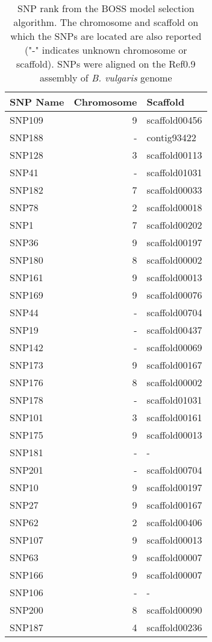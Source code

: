 \documentclass[smallextended]{svjour3}       %
\begin{document}
\begin{longtable}{lrl}
\caption{SNP rank from the BOSS model selection algorithm. The chromosome and scaffold on which the SNPs are located are also reported ("-" indicates unknown chromosome or scaffold). SNPs were aligned on the Ref0.9 assembly of \emph{B. vulgaris} genome\label{tab:rank}} \\ 
 SNP Name & Chromosome & Scaffold \\ 
  \hline
SNP109 &   9 & scaffold00456 \\ 
  SNP188 & - & contig93422 \\ 
  SNP128 &   3 & scaffold00113 \\ 
  SNP41 & - & scaffold01031 \\ 
  SNP182 &   7 & scaffold00033 \\ 
  SNP78 &   2 & scaffold00018 \\ 
  SNP1 &   7 & scaffold00202 \\ 
  SNP36 &   9 & scaffold00197 \\ 
  SNP180 &   8 & scaffold00002 \\ 
  SNP161 &   9 & scaffold00013 \\ 
  SNP169 &   9 & scaffold00076 \\ 
  SNP44 & - & scaffold00704 \\ 
  SNP19 & - & scaffold00437 \\ 
  SNP142 & - & scaffold00069 \\ 
  SNP173 &   9 & scaffold00167 \\ 
  SNP176 &   8 & scaffold00002 \\ 
  SNP178 & - & scaffold01031 \\ 
  SNP101 &   3 & scaffold00161 \\ 
  SNP175 &   9 & scaffold00013 \\ 
  SNP181 & - & - \\ 
  SNP201 & - & scaffold00704 \\ 
  SNP10 &   9 & scaffold00197 \\ 
  SNP27 &   9 & scaffold00167 \\ 
  SNP62 &   2 & scaffold00406 \\ 
  SNP107 &   9 & scaffold00013 \\ 
  SNP63 &   9 & scaffold00007 \\ 
  SNP166 &   9 & scaffold00007 \\ 
  SNP106 & - & - \\ 
  SNP200 &   8 & scaffold00090 \\ 
  SNP187 &   4 & scaffold00236 \\ 

\end{longtable}
\end{document}
